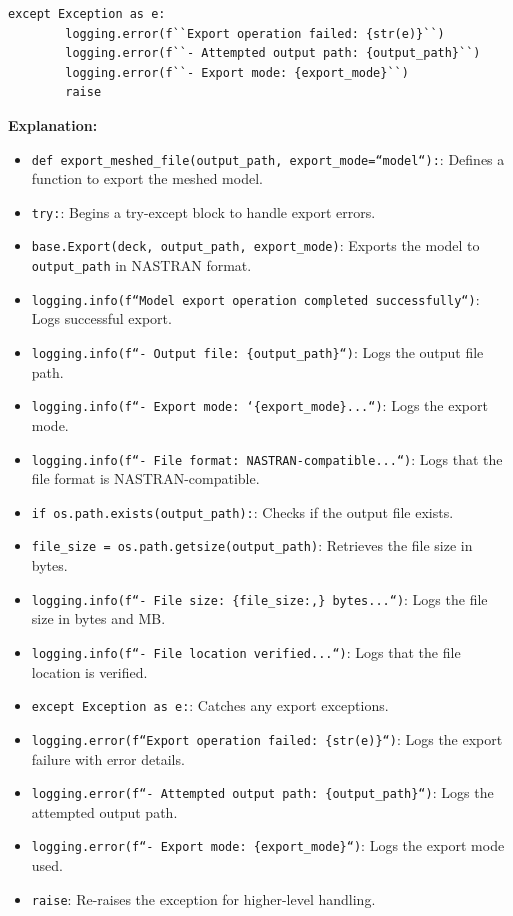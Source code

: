 \documentclass{book}
\begin{document}
\begin{itemize}[leftmargin=*,label=\textbullet]
\begin{lstlisting}[caption={Export Function},label={lst:export}]
    except Exception as e:
        logging.error(f``Export operation failed: {str(e)}``)
        logging.error(f``- Attempted output path: {output_path}``)
        logging.error(f``- Export mode: {export_mode}``)
        raise
\end{lstlisting}
\textbf{Explanation:}
\begin{itemize}
    \item \texttt{def export\_meshed\_file(output\_path, export\_mode=``model``):}: Defines a function to export the meshed model.
    \item \texttt{try:}: Begins a try-except block to handle export errors.
    \item \texttt{base.Export(deck, output\_path, export\_mode)}: Exports the model to \texttt{output\_path} in NASTRAN format.
    \item \texttt{logging.info(f``Model export operation completed successfully``)}: Logs successful export.
    \item \texttt{logging.info(f``- Output file: \{output\_path\}``)}: Logs the output file path.
    \item \texttt{logging.info(f``- Export mode: `\textquotesingle\{export\_mode\}\textquotesingle...``)}: Logs the export mode.
    \item \texttt{logging.info(f``- File format: NASTRAN-compatible...``)}: Logs that the file format is NASTRAN-compatible.
    \item \texttt{if os.path.exists(output\_path):}: Checks if the output file exists.
    \item \texttt{file\_size = os.path.getsize(output\_path)}: Retrieves the file size in bytes.
    \item \texttt{logging.info(f``- File size: \{file\_size:,\} bytes...``)}: Logs the file size in bytes and MB.
    \item \texttt{logging.info(f``- File location verified...``)}: Logs that the file location is verified.
    \item \texttt{except Exception as e:}: Catches any export exceptions.
    \item \texttt{logging.error(f``Export operation failed: \{str(e)\}``)}: Logs the export failure with error details.
    \item \texttt{logging.error(f``- Attempted output path: \{output\_path\}``)}: Logs the attempted output path.
    \item \texttt{logging.error(f``- Export mode: \{export\_mode\}``)}: Logs the export mode used.
    \item \texttt{raise}: Re-raises the exception for higher-level handling.
\end{itemize}


\end{itemize}
\end{document}
